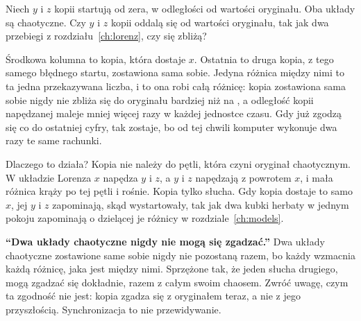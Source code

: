 
\begin{think}
Niech $y$ i $z$ kopii startują od zera, w odległości  od
wartości oryginału. Oba układy są chaotyczne. Czy $y$ i $z$ kopii oddalą się
od wartości oryginału, tak jak dwa przebiegi z rozdziału~\ref{ch:lorenz},
czy się zbliżą?
\end{think}



\noindent
Środkowa kolumna to kopia, która dostaje $x$. Ostatnia to druga kopia, z
tego samego błędnego startu, zostawiona sama sobie. Jedyna różnica między
nimi to ta jedna przekazywana liczba, i to ona robi całą różnicę: kopia
zostawiona sama sobie nigdy nie zbliża się do oryginału bardziej niż na
, a odległość kopii napędzanej maleje mniej więcej
 razy w każdej jednostce czasu. Gdy już zgodzą się co
do ostatniej cyfry, tak zostaje, bo od tej chwili komputer wykonuje dwa razy
te same rachunki.

Dlaczego to działa? Kopia nie należy do pętli, która czyni oryginał
chaotycznym. W układzie Lorenza $x$ napędza $y$ i $z$, a $y$ i $z$ napędzają
z powrotem $x$, i mała różnica krąży po tej pętli i rośnie. Kopia tylko
słucha. Gdy kopia dostaje to samo $x$, jej $y$ i $z$ zapominają, skąd wystartowały,
tak jak dwa kubki herbaty w jednym pokoju zapominają o dzielącej je różnicy
w rozdziale~\ref{ch:models}.


\begin{trapbox}
\textbf{\enquote{Dwa układy chaotyczne nigdy nie mogą się zgadzać.}} Dwa
układy chaotyczne zostawione same sobie nigdy nie pozostaną razem, bo każdy
wzmacnia każdą różnicę, jaka jest między nimi. Sprzężone tak, że jeden
słucha drugiego, mogą zgadzać się dokładnie, razem z całym swoim chaosem.
Zwróć uwagę, czym ta zgodność nie jest: kopia zgadza się z oryginałem teraz,
a nie z jego przyszłością. Synchronizacja to nie przewidywanie.
\end{trapbox}


